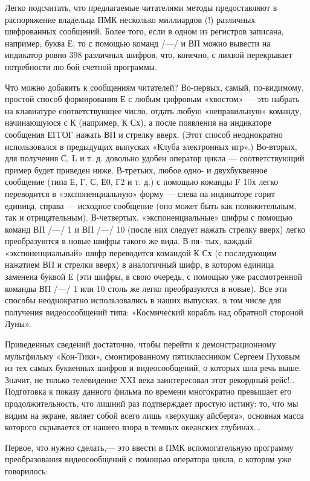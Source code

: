 \documentclass[11pt,a4paper,oneside]{article}
\begin{document}
Легко подсчитать, что предлагаемые читателями методы предоставляют в распоряжение владельца ПМК несколько миллиардов (!) различных шифрованных сообщений. Более того, если в одном из регистров записана, например, буква Е, то с помощью команд /—/ и ВП можно вывести на индикатор ровно 398 различных шифров, что, конечно, с лихвой перекрывает потребности лю
бой счетной программы.

Что можно добавить к сообщениям читателей? Во-первых, самый, по-видимому, простой способ формирования Е с любым цифровым «хвостом» — это набрать на клавиатуре соответствующее число, отдать любую «неправильную» команду, начинающуюся с К (например, К Сх), а после появления на индикаторе сообщения ЕГГОГ нажать ВП и стрелку вверх. (Этот способ неоднократно использовался в предыдущих выпусках «Клуба электронных игр».) Во-вторых, для получения С, L и т. д. довольно удобен оператор цикла — соответствующий пример будет приведен ниже. В-третьих, любое одно- и двухбуквенное сообщение (типа Е, Г, С, Е0, Г2 и т. д.) с помощью команды F 10х легко переводится в «экспоненциальную» форму — слева на индикаторе горит единица, справа — исходное сообщение (оно может быть как положительным, так и отрицательным). В-четвертых, «экспоненциальные» шифры с помощью команд ВП /—/ 1 и ВП /—/ 10 (после них следует нажать стрелку вверх) легко преобразуются в новые шифры такого же вида. В-пя- тых, каждый «экспоненциальный» шифр переводится командой К Сх (с последующим нажатием ВП и стрелки вверх) в аналогичный шифр, в котором единица заменена буквой Е (эти шифры, в свою очередь, с помощью уже рассмотренной команды ВП /—/ 1 или 10 столь же легко преобразуются в новые). Все эти способы неоднократно использовались в наших выпусках, в том числе для получения видеосообщений типа: «Космический корабль над обратной стороной Луны».

Приведенных сведений достаточно, чтобы перейти к демонстрационному мультфильму «Кон-Тики», смонтированному пятиклассником Сергеем Пуховым из тех самых буквенных шифров и видеосообщений, о которых шла речь выше. Значит, не только телевидение XXI века заинтересовал этот рекордный рейс!.. Подготовка к показу данного фильма по времени многократно превышает его продолжительность, что лишний раз подтверждает простую истину: то, что мы видим на экране, являет собой всего лишь «верхушку айсберга», основная масса которого скрывается от нашего взора в темных океанских глубинах...

Первое, что нужно сделать,— это ввести в ПМК вспомогательную программу преобразования видеосообщений с помощью оператора цикла, о котором уже говорилось:
\end{document}

